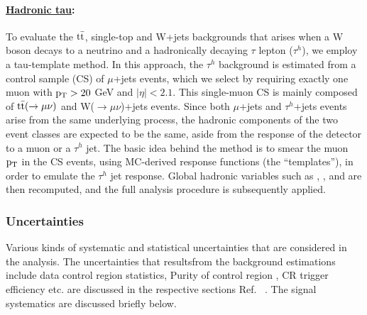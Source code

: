 \paragraph{\underline{Hadronic tau}: }

To evaluate the $\rm t\bar{t}$, single-top and W+jets backgrounds
that arises when a W boson decays to a neutrino and
a hadronically decaying $\tau$ lepton ($\tau^{h}$),
we employ a tau-template method. %
In this approach, the $\tau^{h}$ background is estimated from a control sample (CS)
of $\mu$+jets events,
which we select by requiring exactly one muon with $\rm p_{T}>20$ GeV and $|\eta|<2.1$. 
This single-muon CS is
mainly composed of $\rm t\bar{t}(\rightarrow \mu\nu)$ and W($\rightarrow \mu\nu$)+jets events.
Since both $\mu$+jets and $\tau^{h}$+jets events 
arise from the same underlying process,
the hadronic components of the two event classes are expected to be the same,
aside from the response of the 
detector to a muon or a $\tau^{h}$ jet. 
The basic idea behind the method
is to smear the muon $\rm p_{T}$ in the CS events,
using MC-derived response functions (the ``templates''),
in order to emulate the $\tau^{h}$ jet response.
Global hadronic variables such as \njets, \HT, and \MHT
are then recomputed, and the full analysis procedure is subsequently applied. 






\subsubsection{Uncertainties}

Various kinds of systematic and statistical uncertainties that are considered in the analysis. The uncertainties that resultsfrom the background estimations include data control region statistics, Purity of control region , CR trigger efficiency etc. are discussed in the respective sections Ref. ~\cite{CMS-PAS-SUS-15-002}. The signal systematics are discussed briefly below.



